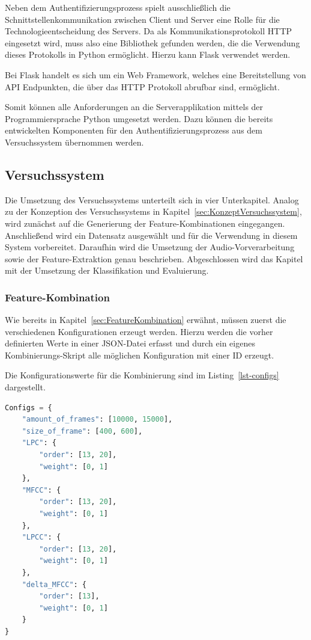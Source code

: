Neben dem Authentifizierungsprozess spielt ausschließlich die Schnittstellenkommunikation zwischen Client und Server eine Rolle für die Technologieentscheidung des Servers.
Da als Kommunikationsprotokoll HTTP eingesetzt wird, muss also eine Bibliothek gefunden werden, die die Verwendung dieses Protokolls in Python ermöglicht.
Hierzu kann Flask verwendet werden.

Bei Flask handelt es sich um ein Web Framework, welches eine Bereitstellung von \ac{API} Endpunkten, die über das \ac{HTTP} Protokoll abrufbar sind, ermöglicht.

Somit können alle Anforderungen an die Serverapplikation mittels der Programmiersprache Python umgesetzt werden.
Dazu können die bereits entwickelten Komponenten für den Authentifizierungsprozess aus dem Versuchssystem übernommen werden.

\textauthor{\vHS}{}{}

\subsection{Versuchssystem}\label{sec:UmsetzungVersuchssystem}
Die Umsetzung des Versuchssystems unterteilt sich in vier Unterkapitel.
Analog zu der Konzeption des Versuchssystems in Kapitel~\ref{sec:KonzeptVersuchssystem}, wird zunächst auf die Generierung der Feature-Kombinationen eingegangen.
Anschließend wird ein Datensatz ausgewählt und für die Verwendung in diesem System vorbereitet.
Daraufhin wird die Umsetzung der Audio-Vorverarbeitung sowie der Feature-Extraktion genau beschrieben.
Abgeschlossen wird das Kapitel mit der Umsetzung der Klassifikation und Evaluierung.

\subsubsection{Feature-Kombination}

Wie bereits in Kapitel~\ref{sec:FeatureKombination} erwähnt, müssen zuerst die verschiedenen Konfigurationen erzeugt werden.
Hierzu werden die vorher definierten Werte in einer JSON-Datei erfasst und durch ein eigenes Kombinierungs-Skript alle möglichen Konfiguration mit einer ID erzeugt.

Die Konfigurationswerte für die Kombinierung sind im Listing~\ref{lst-configs} dargestellt.

\begin{lstlisting}[language=Python,caption=Konfigurationsmöglichkeiten,label=lst-configs]
Configs = {
    "amount_of_frames": [10000, 15000],
    "size_of_frame": [400, 600],
    "LPC": {
        "order": [13, 20],
        "weight": [0, 1]
    },
    "MFCC": {
        "order": [13, 20],
        "weight": [0, 1]
    },
    "LPCC": {
        "order": [13, 20],
        "weight": [0, 1]
    },
    "delta_MFCC": {
        "order": [13],
        "weight": [0, 1]
    }
}
\end{lstlisting}

